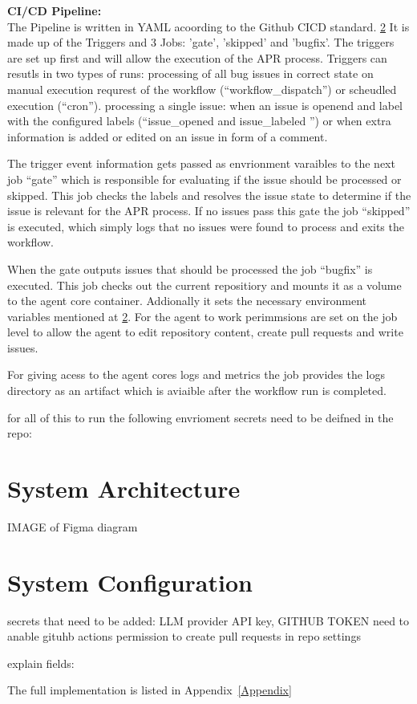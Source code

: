 \textbf{CI/CD Pipeline:}\\
The Pipeline is written in YAML acoording to the Github CICD standard. \ref{} It is made up of the Triggers and 3 Jobs: 'gate', 'skipped' and 'bugfix'.
The triggers are set up first and will allow the execution of the APR process.
Triggers can resutls in two types of runs:
processing of all bug issues in correct state on manual execution requrest of the workflow (``workflow\_dispatch'') or scheudled execution (``cron'').
processing a single issue: when an issue is openend and label with the configured labels (``issue\_opened and issue\_labeled '') or when extra information is added or edited on an issue in form of a comment.

The trigger  event information gets passed as envrionment varaibles to the next job
``gate'' which is responsible for evaluating if the issue should be processed or skipped. This job checks the labels and resolves the issue state to determine if the issue is relevant for the APR process.
If no issues pass this gate the job ``skipped'' is executed, which simply logs that no issues were found to process and exits the workflow.

When the gate outputs issues that should be processed the job ``bugfix'' is executed. This job checks out the current repositiory and mounts it as a volume to the agent core container. Addionally it sets the necessary environment variables mentioned at \ref{}. For the agent to work perimmsions are set on the job level to allow the agent to edit repository content, create pull requests and write issues.

For giving acess to the agent cores logs and metrics the job provides the logs directory as an artifact which is aviaible after the workflow run is completed.


for all of this to run the following envrioment secrets need to be deifned in the repo:


\section{System Architecture}

IMAGE of Figma diagram



\section{System Configuration}




secrets that need to be added:
LLM provider API key, GITHUB TOKEN
need to anable gituhb actions permission to create pull requests in repo settings

explain fields:

The full implementation is listed in Appendix~\ref{Appendix}